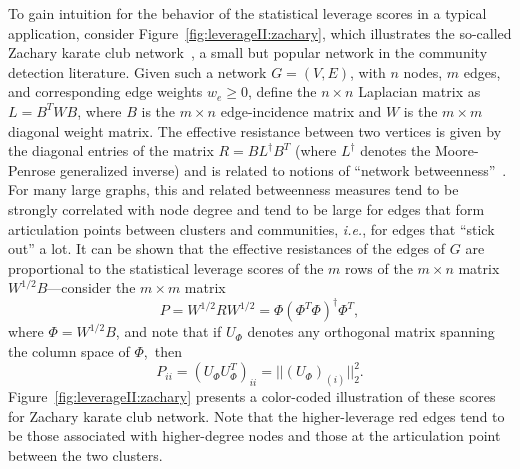 \documentclass[twoside]{article}
\begin{document}
To gain intuition for the behavior of the statistical leverage scores in a 
typical application, consider Figure~\ref{fig:leverageII:zachary}, which 
illustrates the so-called Zachary karate club 
network~\cite{zachary77karate}, a small but popular network in the community 
detection literature.
Given such a network $G=(V,E)$, with $n$ nodes, $m$ edges, and corresponding 
edge weights $w_e \ge 0$, define the $n \times n$ Laplacian matrix as 
$L=B^T W B$, where $B$ is the $m \times n$ edge-incidence matrix and $W$ is 
the $m \times m$ diagonal weight matrix.
The effective resistance between two vertices is given by the diagonal 
entries of the matrix $R= B L^{\dagger} B^T$ (where $L^{\dagger}$ denotes the 
Moore-Penrose generalized inverse) and is related to notions of ``network 
betweenness''~\cite{newman05_betweenness}.
For many large graphs, this and related betweenness measures tend to be strongly correlated with
node degree and tend to be large for edges that form articulation points
between clusters and communities, \emph{i.e.}, for edges that ``stick out'' 
a lot.
It can be shown that the effective resistances of the edges of $G$ are 
proportional to the statistical leverage scores of the $m$ rows of the 
$m \times n$ matrix $W^{1/2}B$---consider the $m \times m$ matrix
$$ P = W^{1/2}RW^{1/2} =  \Phi(\Phi^T\Phi)^{\dagger}\Phi^T ,$$
where $ \Phi = W^{1/2}B $, and note that if $U_{\Phi}$ denotes any 
orthogonal matrix spanning the column space of $\Phi$,~then
$$ P_{ii} = (U_{\Phi}U_{\Phi}^T)_{ii} = ||(U_{\Phi})_{(i)}||_2^2 .$$
Figure~\ref{fig:leverageII:zachary} presents a color-coded illustration of 
these scores for Zachary karate club network.
Note that the higher-leverage red edges tend to be those associated with 
higher-degree nodes and those at the articulation point between the two 
clusters.
\end{document}
